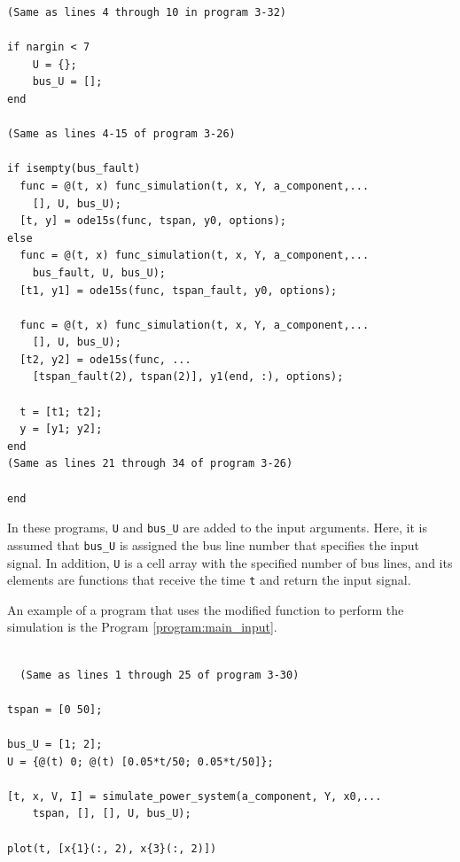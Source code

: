 \documentclass[tombow,dvipdfmx]{corona-a5-1.1}
\begin{document}
\begin{例}
\begin{PROGRAMA}[count,title={simulate\_power\_system.m}]
\begin{verbatim}
(Same as lines 4 through 10 in program 3-32)

if nargin < 7
    U = {};
    bus_U = [];
end

(Same as lines 4-15 of program 3-26)

if isempty(bus_fault)
  func = @(t, x) func_simulation(t, x, Y, a_component,...
    [], U, bus_U);
  [t, y] = ode15s(func, tspan, y0, options);
else
  func = @(t, x) func_simulation(t, x, Y, a_component,...
    bus_fault, U, bus_U);
  [t1, y1] = ode15s(func, tspan_fault, y0, options);
  
  func = @(t, x) func_simulation(t, x, Y, a_component,...
    [], U, bus_U);
  [t2, y2] = ode15s(func, ...
    [tspan_fault(2), tspan(2)], y1(end, :), options);
  
  t = [t1; t2];
  y = [y1; y2];
end
(Same as lines 21 through 34 of program 3-26)

end
\end{verbatim}
\end{PROGRAMA}

In these programs, \verb|U| and \verb|bus_U| are added to the input arguments.
Here, it is assumed that \verb|bus_U| is assigned the bus line number that specifies the input signal.
In addition, \verb|U| is a cell array with the specified number of bus lines, and its elements are functions that receive the time \verb|t| and return the input signal.

An example of a program that uses the modified function to perform the simulation is the Program \nobreak\ref{program:main_input}.

\smallskip
\begin{PROGRAMA}[count,title={main\_simulation\_3bus\_input.m}]\label{program:main_input}
\begin{verbatim}

  (Same as lines 1 through 25 of program 3-30)

tspan = [0 50];

bus_U = [1; 2];
U = {@(t) 0; @(t) [0.05*t/50; 0.05*t/50]};

[t, x, V, I] = simulate_power_system(a_component, Y, x0,...
    tspan, [], [], U, bus_U);

plot(t, [x{1}(:, 2), x{3}(:, 2)])
  \end{verbatim}
\end{PROGRAMA}


\end{例}
\end{document}
